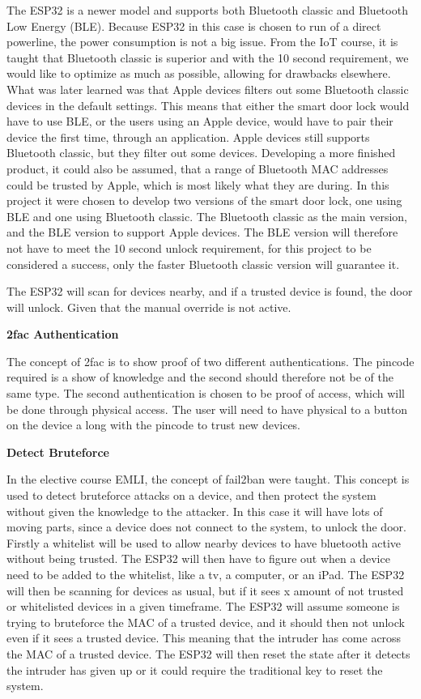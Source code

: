 The ESP32 is a newer model and supports both Bluetooth classic and Bluetooth Low Energy (BLE).
Because ESP32 in this case is chosen to run of a direct powerline, the power consumption is not a big issue.
From the IoT course, it is taught that Bluetooth classic is superior and with the 10 second requirement, we would like to optimize as much as possible, allowing for drawbacks elsewhere.
What was later learned was that Apple devices filters out some Bluetooth classic devices in the default settings.
This means that either the smart door lock would have to use BLE, or the users using an Apple device, would have to pair their device the first time, through an application.
Apple devices still supports Bluetooth classic, but they filter out some devices.
Developing a more finished product, it could also be assumed, that a range of Bluetooth MAC addresses could be trusted by Apple, which is most likely what they are during.
In this project it were chosen to develop two versions of the smart door lock, one using BLE and one using Bluetooth classic.
The Bluetooth classic as the main version, and the BLE version to support Apple devices.
The BLE version will therefore not have to meet the 10 second unlock requirement, for this project to be considered a success, only the faster Bluetooth classic version will guarantee it.

The ESP32 will scan for devices nearby, and if a trusted device is found, the door will unlock.
Given that the manual override is not active.

\textbf{2fac Authentication}

The concept of 2fac is to show proof of two different authentications.
The pincode required is a show of knowledge and the second should therefore not be of the same type.
The second authentication is chosen to be proof of access, which will be done through physical access.
The user will need to have physical to a button on the device a long with the pincode to trust new devices.

\textbf{Detect Bruteforce}

In the elective course EMLI, the concept of fail2ban were taught.
This concept is used to detect bruteforce attacks on a device, and then protect the system without given the knowledge to the attacker.
In this case it will have lots of moving parts, since a device does not connect to the system, to unlock the door.
Firstly a whitelist will be used to allow nearby devices to have bluetooth active without being trusted.
The ESP32 will then have to figure out when a device need to be added to the whitelist, like a tv, a computer, or an iPad.
The ESP32 will then be scanning for devices as usual, but if it sees x amount of not trusted or whitelisted devices in a given timeframe.
The ESP32 will assume someone is trying to bruteforce the MAC of a trusted device, and it should then not unlock even if it sees a trusted device.
This meaning that the intruder has come across the MAC of a trusted device.
The ESP32 will then reset the state after it detects the intruder has given up or it could require the traditional key to reset the system.

